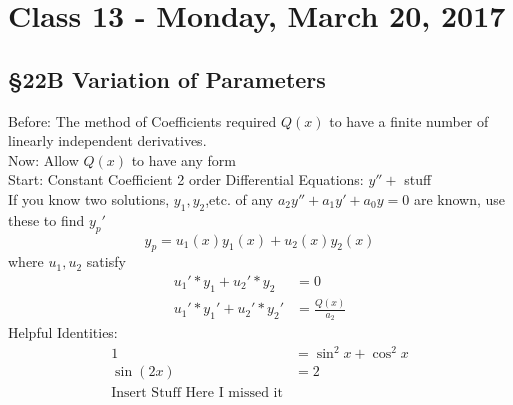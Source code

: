 \chapter{Class 13 - Monday, March 20, 2017}
\section*{\S 22B Variation of Parameters}
Before: The method of Coefficients required $Q(x)$ to have a finite number of linearly independent derivatives.\\
Now: Allow $Q(x)$ to have any form\\
Start: Constant Coefficient 2 order Differential Equations: $y''+$ stuff\\
If you know two solutions, $y_1, y_2$,etc. of any $a_2y''+ a_1y'+a_0y=0$ are known, use these to find $y_p'$\\
$$y_p=u_1(x)y_1(x)+u_2(x)y_2(x)$$ where $u_1, u_2$ satisfy\\
\begin{align*}
    u_1'*y_1+u_2'*y_2&=0\\
    u_1'*y_1'+u_2'*y_2'&=\frac{Q(x)}{a_2}
\end{align*}
Helpful Identities: 
\begin{align*}
1&=\sin^2x+\cos^2x\\
\sin(2x)&=2\\
\text{Insert Stuff Here I missed it}
\end{align*}
